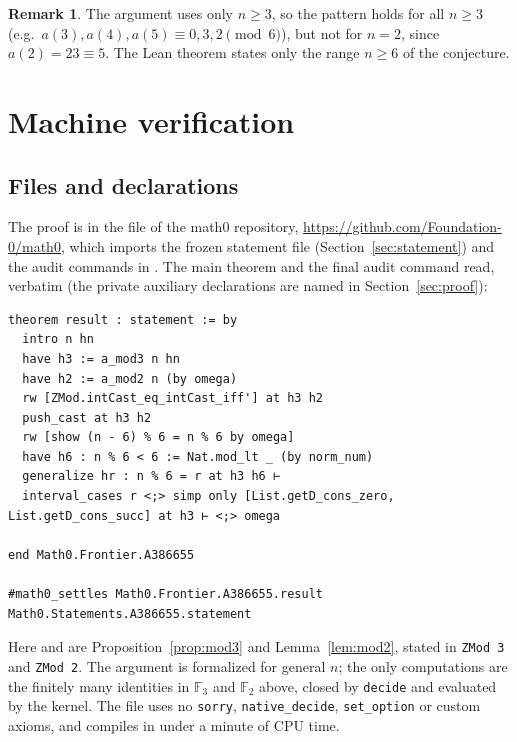 \documentclass[11pt]{amsart}
\theoremstyle{plain}
\theoremstyle{definition}
\newtheorem{remark}[theorem]{Remark}
\newcommand{\F}{\mathbb{F}}
\begin{document}
\begin{remark}\label{rem:n3}
The argument uses only $n\ge3$, so the pattern holds for all $n\ge3$ (e.g.\ $a(3),a(4),a(5)\equiv0,3,2\pmod6$), but not for $n=2$, since $a(2)=23\equiv5$. The Lean theorem states only the range $n\ge6$ of the conjecture.
\end{remark}

\section{Machine verification}\label{sec:lean}

\subsection*{Files and declarations}
The proof is in the file  of the math0 repository, \url{https://github.com/Foundation-0/math0}, which imports the frozen statement file (Section~\ref{sec:statement}) and the audit commands in .
The main theorem  and the final audit command read, verbatim (the private auxiliary declarations are named in Section~\ref{sec:proof}):
\begin{lstlisting}
theorem result : statement := by
  intro n hn
  have h3 := a_mod3 n hn
  have h2 := a_mod2 n (by omega)
  rw [ZMod.intCast_eq_intCast_iff'] at h3 h2
  push_cast at h3 h2
  rw [show (n - 6) % 6 = n % 6 by omega]
  have h6 : n % 6 < 6 := Nat.mod_lt _ (by norm_num)
  generalize hr : n % 6 = r at h3 h6 ⊢
  interval_cases r <;> simp only [List.getD_cons_zero, List.getD_cons_succ] at h3 ⊢ <;> omega

end Math0.Frontier.A386655

#math0_settles Math0.Frontier.A386655.result Math0.Statements.A386655.statement
\end{lstlisting}
Here  and  are Proposition~\ref{prop:mod3} and Lemma~\ref{lem:mod2}, stated in \texttt{ZMod 3} and \texttt{ZMod 2}.
The argument is formalized for general $n$; the only computations are the finitely many identities in $\F_3$ and $\F_2$ above, closed by \texttt{decide} and evaluated by the kernel.
The file uses no \texttt{sorry}, \texttt{native\_decide}, \texttt{set\_option} or custom axioms, and compiles in under a minute of CPU time.
\end{document}
